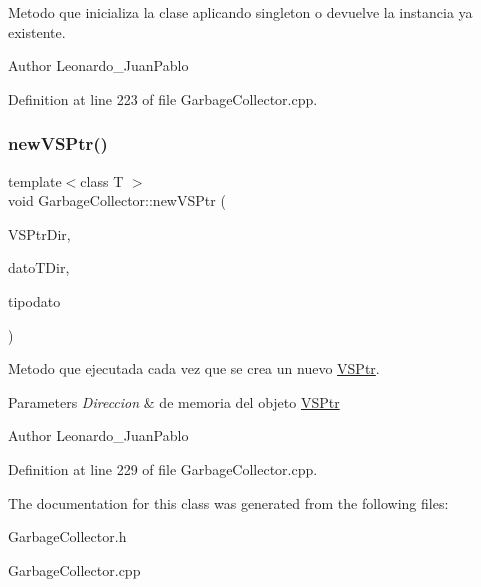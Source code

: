 Metodo que inicializa la clase aplicando singleton o devuelve la instancia ya existente. 

\begin{DoxyAuthor}{Author}
Leonardo\+\_\+\+Juan\+Pablo 
\end{DoxyAuthor}


Definition at line 223 of file Garbage\+Collector.\+cpp.

\mbox{\label{class_garbage_collector_abd2b578c51fe5f8634da54c698e3e4dd}} 
\subsubsection{\texorpdfstring{new\+V\+S\+Ptr()}{newVSPtr()}}
{\footnotesize\ttfamily template$<$class T $>$ \\
void Garbage\+Collector\+::new\+V\+S\+Ptr (\begin{DoxyParamCaption}\item[{\hyperlink{class_v_s_ptr}{V\+S\+Ptr}$<$ T $>$ $\ast$}]{V\+S\+Ptr\+Dir,  }\item[{void $\ast$}]{dato\+T\+Dir,  }\item[{string}]{tipodato }\end{DoxyParamCaption})\hspace{0.3cm}{\ttfamily [static]}}



Metodo que ejecutada cada vez que se crea un nuevo \hyperlink{class_v_s_ptr}{V\+S\+Ptr}. 


\begin{DoxyParams}{Parameters}
{\em Direccion} & de memoria del objeto \hyperlink{class_v_s_ptr}{V\+S\+Ptr} \\
\hline
\end{DoxyParams}
\begin{DoxyAuthor}{Author}
Leonardo\+\_\+\+Juan\+Pablo 
\end{DoxyAuthor}


Definition at line 229 of file Garbage\+Collector.\+cpp.



The documentation for this class was generated from the following files\+:\begin{DoxyCompactItemize}
\item 
Garbage\+Collector.\+h\item 
Garbage\+Collector.\+cpp\end{DoxyCompactItemize}
